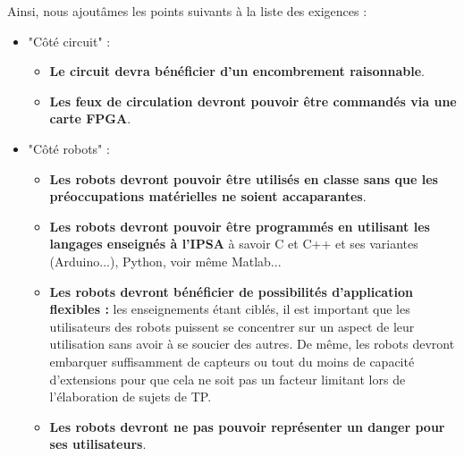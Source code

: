 Ainsi, nous ajoutâmes les points suivants à la liste des exigences :
\begin{itemize}
	\item "Côté circuit" :
	\begin{itemize}
		\item \textbf{Le circuit devra bénéficier d'un encombrement raisonnable}.
		\item \textbf{Les feux de circulation devront pouvoir être commandés via une carte FPGA}.
	\end{itemize}
	\item "Côté robots" :
	\begin{itemize}
		\item \textbf{Les robots devront pouvoir être utilisés en classe sans que les préoccupations matérielles ne soient accaparantes}.
		\item \textbf{Les robots devront pouvoir être programmés en utilisant les langages enseignés à l'IPSA} à savoir C et C++ et ses variantes (Arduino...), Python, voir même Matlab...
		\item \textbf{Les robots devront bénéficier de possibilités d'application flexibles :} les enseignements étant ciblés, il est important que les utilisateurs des robots puissent se concentrer sur un aspect de leur utilisation sans avoir à se soucier des autres. De même, les robots devront embarquer suffisamment de capteurs ou tout du moins de capacité d'extensions pour que cela ne soit pas un facteur limitant lors de l'élaboration de sujets de TP.
		\item \textbf{Les robots devront ne pas pouvoir représenter un danger pour ses utilisateurs}.
	\end{itemize}
\end{itemize}